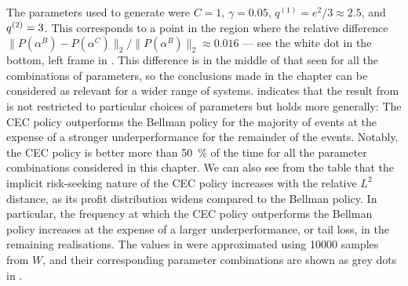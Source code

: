 \documentclass[main.tex]{subfiles}
\begin{document}
The parameters used to generate 
were $C=1$, $\gamma=0.05$, $q^{(1)}=e^2/3\approx2.5$, and
$q^{(2)}=\nobreak3$. This corresponds to a point
in the region where the relative difference
$\|P(\alpha^B)-P(\alpha^C)\|_2/\|P(\alpha^B)\|_2 \approx 0.016$ ---
see the
white dot in the
bottom, left frame in .
This difference is in the middle of that seen for all the
combinations of parameters, so the conclusions made in the chapter
can be considered as relevant for a wider range of systems.
indicates that the result from  is not restricted
to particular choices of parameters but holds more generally:
The CEC policy
outperforms the Bellman policy for the
majority of events at the expense of a stronger underperformance
for the remainder of the events. Notably, the CEC policy is better
more than \SI{50}{\percent} of the time for all the parameter
combinations considered in this chapter.
We can also see from the table that the implicit risk-seeking nature
of the CEC policy increases with
the relative $L^2$ distance, as its profit distribution widens compared to
the Bellman policy.
In particular, the frequency at which the CEC policy
outperforms the Bellman policy increases at the expense of a larger
underperformance, or tail loss, in the remaining realisations.
The values in  were approximated using \num{10000} samples
from $W$, and their corresponding parameter combinations are shown as
grey dots in .
\end{document}
